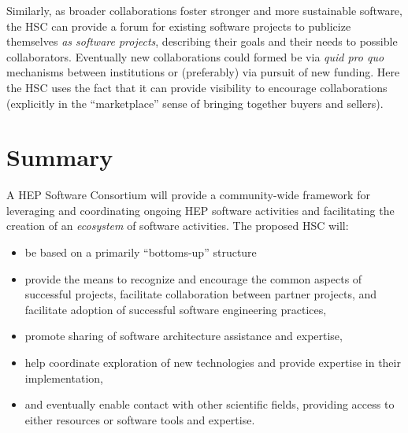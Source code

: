 \documentclass[12pt,letterpaper,fleqn]{article}
\begin{document}
Similarly, as broader collaborations foster stronger and more sustainable
software, the HSC can provide a forum for existing software projects to 
publicize themselves {\em as software projects}, describing their goals and 
their needs to possible collaborators. Eventually new collaborations could 
formed be via {\em quid pro quo} mechanisms between institutions or 
(preferably) via pursuit of new funding. Here the HSC uses the fact
that it can provide visibility to encourage collaborations (explicitly
in the ``marketplace'' sense of bringing together buyers and sellers).




\section{Summary} 

A HEP Software Consortium will provide a community-wide framework
for leveraging and coordinating ongoing HEP software activities and facilitating the creation of an {\it ecosystem} of software activities.   The proposed HSC will:
\begin{itemize}
\item be based on a primarily ``bottoms-up'' structure
\item provide the means to recognize and encourage the common aspects
of successful projects, facilitate collaboration between partner
projects, and facilitate adoption of successful software engineering
practices,
\item promote sharing of software architecture assistance and expertise,
\item help coordinate exploration of new technologies and provide expertise in their implementation,
\item and eventually enable contact with other scientific fields,
providing access to either resources or software tools and expertise.
\end{itemize}



\newpage

%
%
\end{document}
